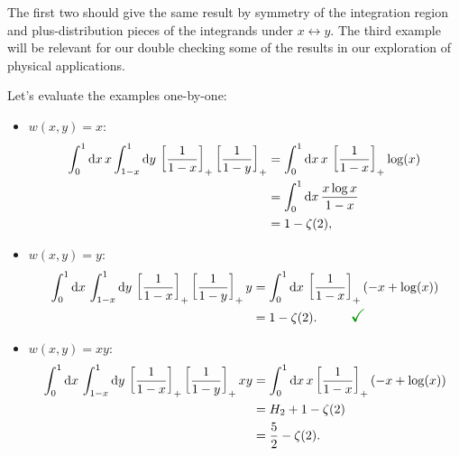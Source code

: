\begin{subappendices}
\begin{example}
The first two should give the same result by symmetry of the integration region and plus-distribution pieces of the integrands under \(x \leftrightarrow y\).
%
The third example will be relevant for our double checking some of the results in our exploration of physical applications.

Let's evaluate the examples one-by-one:
\begin{itemize}
    \item
        \(w(x,y) = x\):
        \begin{align}
            \int_{0}^{1} \dd x\,
            x
            \int_{1-x}^{1} \dd y\,
            \left[\frac{1}{1-x}\right]_+
            \left[\frac{1}{1-y}\right]_+
            &=
            \int_{0}^{1} \dd x\,x\,
            \left[\frac{1}{1-x}\right]_+
            \log(x)
            \\
            &=
            \int_{0}^{1} \dd x\,
            \frac{x \log x}{1-x}
            \notag
            \\
            &= 1 - \zeta(2)
            \notag
            ,
        \end{align}

    \item
        \(w(x,y) = y\):
        \begin{align}
            \int_{0}^{1} \dd x\,
            \int_{1-x}^{1} \dd y\,
            \le[\frac{1}{1-x}\ri]_+
            \le[\frac{1}{1-y}\ri]_+
            y
            &=
            \int_{0}^{1} \dd x\,
            \le[\frac{1}{1-x}\ri]_+
            \le(-x + \log(x)\ri)
            \\
            &=
            1 - \zeta(2)
            \notag
            .
            ~~~~~~~~
            {\Large \textbf{\textcolor{green!60!black}{\checkmark}}}
        \end{align}

    \item
        \(w(x,y) = x y\):
        \begin{align}
            \int_{0}^{1} \dd x\,
            \int_{1-x}^{1} \dd y\,
            \left[\frac{1}{1-x}\right]_+
            \left[\frac{1}{1-y}\right]_+
            x y
            &=
            \int_{0}^{1} \dd x\,x
            \left[\frac{1}{1-x}\right]_+
            \left(-x + \log(x)\right)
            \\
            &=
            H_2 + 1 - \zeta(2)
            \notag
            \\
            &=
            \frac{5}{2} - \zeta(2)
            \notag
            .
        \end{align}
\end{itemize}
\end{example}




\end{subappendices}
